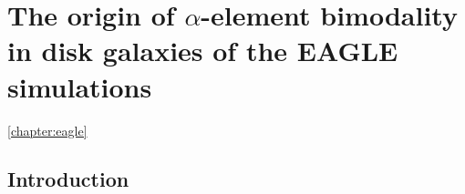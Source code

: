 \chapter{The origin of $\alpha$-element bimodality in disk galaxies of the EAGLE simulations}
\ref{chapter:eagle}
\section{Introduction}
 \label{sec:intro}


